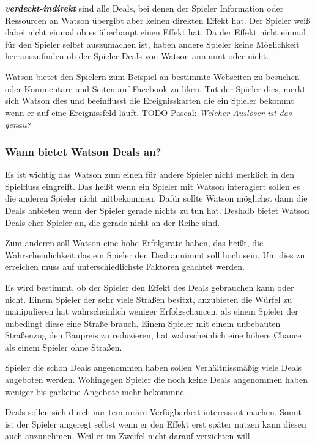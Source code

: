 \documentclass[german]{cgspaper} %
\newcommand{\todo}[1]{\textit{#1}}
\newcommand{\Pascal}[1]{\textcolor{colorPascal}{TODO Pascal:} \todo{#1} }
\newcommand{\neuerBegriff}[1]{\textbf{\textit{#1}}}
\begin{document}
\neuerBegriff{verdeckt-indirekt} sind alle Deals, bei denen der Spieler Information oder Ressourcen an Watson übergibt aber keinen direkten Effekt hat.
Der Spieler weiß dabei nicht einmal ob es überhaupt einen Effekt hat.
Da der Effekt nicht einmal für den Spieler selbst auszumachen ist, haben andere Spieler keine Möglichkeit herrauszufinden ob der Spieler Deals von Watson annimmt oder nicht.

Watson bietet den Spielern zum Beispiel an bestimmte Webseiten zu besuchen oder Kommentare und Seiten auf Facebook zu liken.
Tut der Spieler dies, merkt sich Watson dies und beeinflusst die Ereignisskarten die ein Spieler bekommt wenn er auf eine Ereignissfeld läuft.
\Pascal{Welcher Auslöser ist das genau?}

\subsubsection{Wann bietet Watson Deals an?}

Es ist wichtig das Watson zum einen für andere Spieler nicht merklich in den Spielfluss eingreift.
Das heißt wenn ein Spieler mit Watson interagiert sollen es die anderen Spieler nicht mitbekommen.
Dafür sollte Watson möglichst dann die Deals anbieten wenn der Spieler gerade nichts zu tun hat.
Deshalb bietet Watson Deals eher Spieler an, die gerade nicht an der Reihe sind.

Zum anderen soll Watson eine hohe Erfolgsrate haben, das heißt, die Wahrscheinlichkeit das ein Spieler den Deal annimmt soll hoch sein.
Um dies zu erreichen muss auf unterschiedlichste Faktoren geachtet werden. 

Es wird bestimmt, ob der Spieler den Effekt des Deals gebrauchen kann oder nicht. 
Einem Spieler der sehr viele Straßen besitzt, anzubieten die Würfel zu manipulieren hat wahrscheinlich weniger Erfolgschancen, als einem Spieler der unbedingt diese eine Straße brauch.
Einem Spieler mit einem unbebauten Straßenzug den Baupreis zu reduzieren, hat wahrscheinlich eine höhere Chance als einem Spieler ohne Straßen.

Spieler die schon Deals angenommen haben sollen Verhältnissmäßig viele Deals angeboten werden.
Wohingegen Spieler die noch keine Deals angenommen haben weniger bis garkeine Angebote mehr bekommne.

Deals sollen sich durch nur temporäre Verfügbarkeit interessant machen.
Somit ist der Spieler angeregt selbst wenn er den Effekt erst später nutzen kann diesen auch anzunehmen.
Weil er im Zweifel nicht darauf verzichten will.
\end{document}
